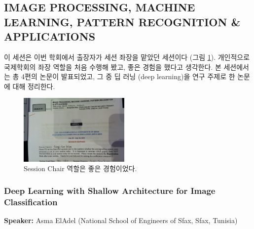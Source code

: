 \documentclass[twocolumn]{article}
\begin{document}
%
%
%

\subsection{IMAGE PROCESSING, MACHINE LEARNING, PATTERN RECOGNITION \& APPLICATIONS}

이 세션은 이번 학회에서 출장자가 세션 좌장을 맡았던 세션이다 (그림 \ref{fig:chair}). 개인적으로 국제학회의 좌장 역할을 처음 수행해 봤고, 좋은 경험을 했다고 생각한다. 본 세션에서는 총 4편의 논문이 발표되었고, 그 중 딥 러닝 (deep learning)을 연구 주제로 한 논문에 대해 정리한다.

\begin{figure}[htb]
        \centering
        \includegraphics[width=0.48\textwidth]{chair.png}
        \caption{Session Chair 역할은 좋은 경험이었다.}
        \label{fig:chair}
\end{figure}

%
%
%
%

\subsubsection{Deep Learning with Shallow Architecture for Image Classification}
\textbf{Speaker:} Asma ElAdel (National School of Engineers of Sfax, Sfax, Tunisia)
\end{document}
